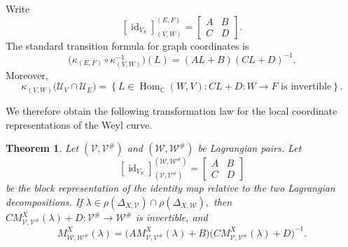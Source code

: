 \documentclass[12pt]{amsart}
\theoremstyle{plain}
\newtheorem{thm}{Theorem}[section]
\theoremstyle{definition}
\theoremstyle{remark}
\numberwithin{equation}{section} \numberwithin{figure}{section}
\newcommand{\mb}[1]{\mathbb{#1}} %
\newcommand{\mc}[1]{\mathcal{#1}}
\newcommand{\id}{\operatorname{id}}
\begin{document}
Write
\[
    [\id_{V_S}]_{(V,W)}^{(E,F)}
    =
    \begin{bmatrix}
        A&B\\
        C&D
    \end{bmatrix}.
\]
The standard transition formula for graph coordinates is
\[
    \bigl(
        \kappa_{(E,F)}
        \circ
        \kappa_{(V,W)}^{-1}
    \bigr)(L)
    =
    (AL+B)(CL+D)^{-1}.
\]
Moreover,
\[
    \kappa_{(V,W)}
    \bigl(\mc U_V\cap\mc U_E\bigr)
    =
    \left\{
        L\in\operatorname{Hom}_{\mb C}(W,V):
        CL+D:W\longrightarrow F
        \text{ is invertible}
    \right\}.
\]



We therefore obtain the following transformation law for the local
coordinate representations of the Weyl curve.

\begin{thm}\label{thm:weyl-transformation-law}
Let \((\mc V,\mc V^\#)\) and \((\mc W,\mc W^\#)\) be Lagrangian
pairs. Let
\[
    [\id_{V_S}]_{(\mc V,\mc V^\#)}^{(\mc W,\mc W^\#)}
    =
    \begin{bmatrix}
        A&B\\
        C&D
    \end{bmatrix}
\]
be the block representation of the identity map relative to the two
Lagrangian decompositions. If
\(
    \lambda
    \in
    \rho(\Delta_{X,\mc V})
    \cap
    \rho(\Delta_{X,\mc W}),
\)
then
\(
    C M_{\mc V,\mc V^\#}^X(\lambda)+D:
    \mc V^\#
    \longrightarrow
    \mc W^\#
\)
is invertible, and
\[
    M_{\mc W,\mc W^\#}^X(\lambda)
    =
    \bigl(
        A M_{\mc V,\mc V^\#}^X(\lambda)+B
    \bigr)
    \bigl(
        C M_{\mc V,\mc V^\#}^X(\lambda)+D
    \bigr)^{-1}.
\]
\end{thm}
\end{document}
